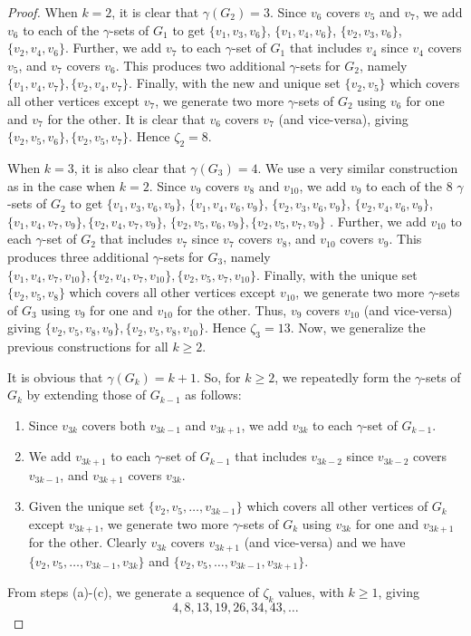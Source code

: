\documentclass[twoside,12pt]{article}
\begin{document}
\begin{proof}
	When $k=2$, it is clear that $\gamma(G_2)=3$. Since $v_6$ covers $v_5$ and $v_7$, we add $v_6$ to each of the $\gamma$-sets of $G_1$ to get $\{v_1,v_3, v_6\}$, $\{v_1,v_4, v_6\}$, $\{v_2,v_3, v_6\}$, $\{v_2,v_4, v_6\}$. Further, we add $v_7$ to each $\gamma$-set of $G_1$ that includes $v_4$ since $v_4$ covers $v_5$, and $v_7$ covers $v_6$. This produces two additional $\gamma$-sets for $G_2$, namely $\{v_1,v_4, v_7\}, \{v_2,v_4, v_7\}$. Finally, with the new and unique set $\{v_2, v_5\}$ which covers all other vertices except $v_7$, we generate two more $\gamma$-sets of $G_2$ using $v_6$ for one and $v_7$ for the other. It is clear that $v_6$ covers $v_7$ (and vice-versa), giving  $\{v_2,v_5, v_6\}, \{v_2, v_5, v_7\}$. Hence $\zeta_2=8$.
	
	When $k=3$, it is also clear that $\gamma(G_3)=4$. We use a very similar construction as in the case when $k=2$. Since $v_9$ covers $v_8$ and $v_{10}$, we add $v_9$ to each of the $8$ $\gamma$-sets of $G_2$ to get 
	$\{v_1,v_3, v_6, v_9\}$, $\{v_1,v_4, v_6, v_9\}$, $\{v_2,v_3, v_6, v_9\}$, $\{v_2,v_4, v_6, v_9\}$, $\{v_1,v_4, v_7, v_9\}, \{v_2,v_4, v_7, v_9\}$, $\{v_2,v_5, v_6, v_9\}, \{v_2, v_5, v_7, v_9\}$
	. Further, we add $v_{10}$ to each $\gamma$-set of $G_2$ that includes $v_7$ since $v_7$ covers $v_8$, and $v_{10}$ covers $v_{9}$. This produces three additional $\gamma$-sets for $G_3$, namely $\{v_1,v_4, v_7, v_{10}\}, \{v_2,v_4, v_7, v_{10}\}, \{v_2, v_5, v_7, v_{10}\}$. Finally, with the unique set $\{v_2, v_5, v_8\}$ which covers all other vertices except $v_{10}$, we generate two more $\gamma$-sets of $G_3$ using $v_9$ for one and $v_{10}$ for the other. Thus, $v_9$ covers $v_{10}$ (and vice-versa) giving  $\{v_2,v_5, v_8, v_9\}, \{v_2, v_5, v_8, v_{10}\}$. Hence $\zeta_3=13$. Now, we generalize the previous constructions for all $k\ge 2$.
	
	It is obvious that $\gamma(G_k)=k+1$. So, for $k\ge 2$, we repeatedly form the $\gamma$-sets of $G_k$ by extending those of $G_{k-1}$ as follows:
	
	\begin{enumerate}
		\item[(a)] Since $v_{3k}$ covers both $v_{3k-1}$ and $v_{3k+1}$, we add $v_{3k}$ to each $\gamma$-set of $G_{k-1}$.
		\item[(b)] We add $v_{3k+1}$ to each $\gamma$-set of $G_{k-1}$ that includes $v_{3k-2}$ since $v_{3k-2}$ covers $v_{3k-1}$, and $v_{3k+1}$ covers $v_{3k}$.
		\item[(c)] Given the unique set $\{v_2,v_5,\ldots,v_{3k-1}\}$ which covers all other vertices of $G_k$ except $v_{3k+1}$, we generate two more $\gamma$-sets of $G_k$ using $v_{3k}$ for one and $v_{3k+1}$ for the other. Clearly $v_{3k}$ covers $v_{3k+1}$ (and vice-versa) and we have $\{v_2,v_5,\ldots,v_{3k-1}, v_{3k}\}$ and $\{v_2,v_5,\ldots,v_{3k-1}, v_{3k+1}\}$. 
	\end{enumerate}
	From steps (a)-(c), we generate a sequence of $\zeta_k$ values, with $k\ge 1$, giving 
	$$4, 8, 13, 19, 26, 34, 43, \ldots  $$
	

\end{proof}
\end{document}
